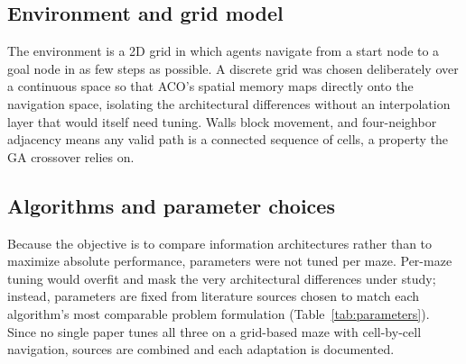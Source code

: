 \documentclass[11pt,a4paper]{article}
\begin{document}
    \subsection{Environment and grid model}
    The environment is a 2D grid in which agents navigate from a start node to a goal node in as few steps as possible. A discrete grid was chosen deliberately over a continuous space so that ACO's spatial memory maps directly onto the navigation space, isolating the architectural differences without an interpolation layer that would itself need tuning. Walls block movement, and four-neighbor adjacency means any valid path is a connected sequence of cells, a property the GA crossover relies on.

    \subsection{Algorithms and parameter choices}
    Because the objective is to compare information architectures rather than to maximize absolute performance, parameters were not tuned per maze. Per-maze tuning would overfit and mask the very architectural differences under study; instead, parameters are fixed from literature sources chosen to match each algorithm's most comparable problem formulation (Table~\ref{tab:parameters}). Since no single paper tunes all three on a grid-based maze with cell-by-cell navigation, sources are combined and each adaptation is documented.
\end{document}
